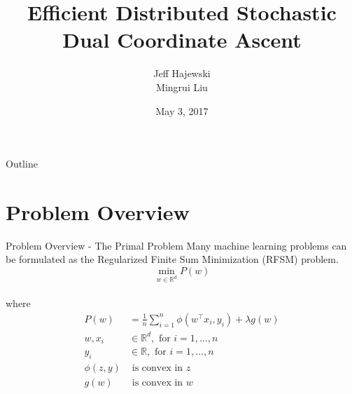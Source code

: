 \documentclass{beamer}
\title{Efficient Distributed Stochastic Dual Coordinate Ascent} %
\author{Jeff Hajewski \\ Mingrui Liu}
\date{May 3, 2017}
\institute{University of Iowa}
\def \R {\mathbb{R}}
\def \R {\mathbb{R}}
\begin{document}
	
	\begin{frame}
		\titlepage %
	\end{frame}
	
	\begin{frame}{Outline}
		\tableofcontents
	\end{frame}
	
\section{Problem Overview}

\begin{frame}{Problem Overview - The Primal Problem}
	Many machine learning problems can be formulated as the Regularized Finite Sum Minimization (RFSM) problem.
  \vspace{1em}
	\begin{equation}
		\label{RLM}
		\min_{w\in\R^d}P(w)
	\end{equation}
  \vspace{1.5em}\\
  where 
  \begin{align*}
    P(w) &= \frac{1}{n}\sum_{i=1}^{n}\phi(w^\top x_i,y_i)+\lambda g(w)\\
    w, x_i & \in \R^d, \text{ for } i = 1, \dots, n\\
    y_i & \in \R, \text{ for } i = 1, \dots, n\\
    \phi(z,y) & \text{ is convex in $z$}\\
    g(w) & \text{ is convex in $w$}\\
  \end{align*}
  
\end{frame}
\end{document}
